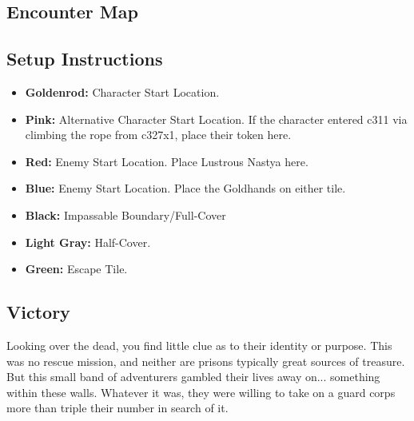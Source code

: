 \subsection*{Encounter Map}
\begin{center}
\end{center}

\subsection*{Setup Instructions}
\begin{itemize}
\item \textbf{Goldenrod:} Character Start Location.
\item \textbf{Pink:} Alternative Character Start Location. If the character entered c311 via climbing the rope from c327x1, place their token here.
\item \textbf{Red:} Enemy Start Location. Place Lustrous Nastya here.
\item \textbf{Blue:} Enemy Start Location. Place the Goldhands on either tile.
\item \textbf{Black:} Impassable Boundary/Full-Cover
\item \textbf{Light Gray:} Half-Cover.
\item \textbf{Green:} Escape Tile.
\end{itemize}

\pagebreak

\subsection*{Victory}
Looking over the dead, you find little clue as to their identity or purpose. This was no rescue mission, and neither are prisons typically great sources of treasure. But this small band of adventurers gambled their lives away on... something within these walls. Whatever it was, they were willing to take on a guard corps more than triple their number in search of it.\\

